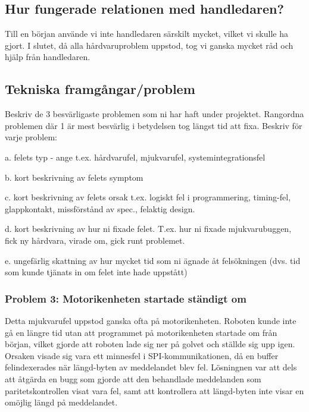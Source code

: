 \documentclass[a4paper,titlepage,12pt]{article}
\begin{document}
	\subsection{Hur fungerade relationen med handledaren?}
    Till en början använde vi inte handledaren särskilt mycket, vilket vi
    skulle ha gjort. I slutet, då alla hårdvaruproblem uppstod, tog vi ganska
    mycket råd och hjälp från handledaren.
	
	\subsection{Tekniska framgångar/problem}
	Beskriv de 3 besvärligaste problemen som ni har haft under projektet. 
	Rangordna problemen där 1 är mest besvärlig i betydelsen tog längst tid att fixa.
	Beskriv för varje problem:

	a. felets typ - ange t.ex.  hårdvarufel, mjukvarufel, systemintegrationsfel 

	b. kort beskrivning av felets symptom 

	c. kort beskrivning av felets orsak t.ex. logiskt fel i programmering, timing-fel, glappkontakt, missförstånd av spec., felaktig design. 

	d. kort beskrivning av hur ni fixade felet. T.ex. hur ni fixade mjukvarubuggen, fick ny hårdvara, virade om, gick runt problemet.

	e. ungefärlig skattning av hur mycket tid som ni ägnade åt felsökningen (dvs. tid som kunde tjänats in om felet inte hade uppstått)
	

    \subsubsection{Problem 3: Motorikenheten startade ständigt om}

    Detta mjukvarufel uppstod ganska ofta på motorikenheten.
    Roboten kunde inte gå en längre tid utan att programmet på motorikenheten
    startade om från början, vilket gjorde att roboten lade sig ner på golvet
    och ställde sig upp igen. Orsaken visade sig vara ett minnesfel i
    SPI-kommunikationen, då en buffer felindexerades när längd-byten av
    meddelandet blev fel. Lösningnen var att dels att åtgärda en bugg som
    gjorde att den behandlade meddelanden som paritetskontrollen visat vara
    fel, samt att kontrollera att längd-byten inte visar en omöjlig längd på
    meddelandet.
\end{document}
